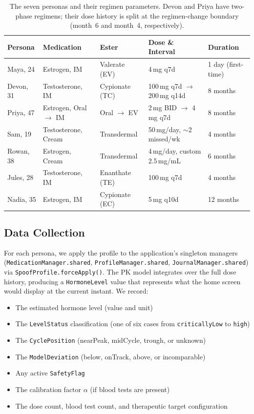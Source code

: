\documentclass[11pt,a4paper]{article}
\newcommand{\code}[1]{\texttt{\small #1}}
\begin{document}
\begin{table}[h]
\centering
\small
\begin{tabular}{@{}lllll@{}}
\toprule
\textbf{Persona} & \textbf{Medication} & \textbf{Ester} & \textbf{Dose \& Interval} & \textbf{Duration} \\
\midrule
Maya, 24  & Estrogen, IM & Valerate (EV)      & 4\,mg q7d            & 1 day (first-time) \\
Devon, 31 & Testosterone, IM & Cypionate (TC)  & 100\,mg q7d $\rightarrow$ 200\,mg q14d & 8 months \\
Priya, 47 & Estrogen, Oral $\rightarrow$ IM & Oral $\rightarrow$ EV & 2\,mg BID $\rightarrow$ 4\,mg q7d & 8 months \\
Sam, 19   & Testosterone, Cream & Transdermal  & 50\,mg/day, $\sim$2 missed/wk & 4 months \\
Rowan, 38 & Estrogen, Cream & Transdermal     & 4\,mg/day, custom 2.5\,mg/mL & 6 months \\
Jules, 28 & Testosterone, IM & Enanthate (TE)  & 100\,mg q7d          & 4 months \\
Nadia, 35 & Estrogen, IM & Cypionate (EC)    & 5\,mg q10d           & 12 months \\
\bottomrule
\end{tabular}
\caption{The seven personas and their regimen parameters. Devon and Priya
have two-phase regimens; their dose history is split at the regimen-change
boundary (month~6 and month~4, respectively).}
\label{tab:personas}
\end{table}

\subsection{Data Collection}

For each persona, we apply the profile to the application's singleton
managers (\code{MedicationManager.shared}, \code{ProfileManager.shared},
\code{JournalManager.shared}) via \code{SpoofProfile.forceApply()}. The PK
model integrates over the full dose history, producing a
\code{HormoneLevel} value that represents what the home screen would display
at the current instant. We record:

\begin{itemize}[nosep,leftmargin=1.4em]
\item The estimated hormone level (value and unit)
\item The \code{LevelStatus} classification (one of six cases from
  \code{criticallyLow} to \code{high})
\item The \code{CyclePosition} (nearPeak, midCycle, trough, or unknown)
\item The \code{ModelDeviation} (below, onTrack, above, or incomparable)
\item Any active \code{SafetyFlag}
\item The calibration factor $\alpha$ (if blood tests are present)
\item The dose count, blood test count, and therapeutic target configuration
\end{itemize}
\end{document}
